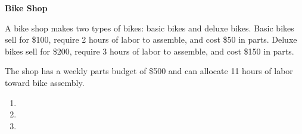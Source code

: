 \textbf{Bike Shop}

A bike shop makes two types of bikes: basic bikes and deluxe bikes. Basic bikes sell for \$100, require 2 hours of labor
to assemble, and cost \$50 in parts. Deluxe bikes sell for \$200, require 3 hours of labor to assemble, and cost \$150 
in parts.

The shop has a weekly parts budget of \$500 and can allocate 11 hours of labor toward bike assembly.

\begin{enumerate}
    \item 
    \pagebreak
    \item 
    \pagebreak
    \item 
\end{enumerate}